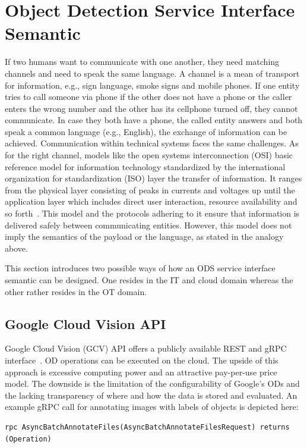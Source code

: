 \section{Object Detection Service Interface Semantic}
If two humans want to communicate with one another, they need matching channels and need to speak the same language. A channel is a mean of transport for information, e.g., sign language, smoke signs and mobile phones. If one entity tries to call someone via phone if the other does not have a phone or the caller enters the wrong number and the other has its cellphone turned off, they cannot communicate. In case they both have a phone, the called entity answers and both speak a common language (e.g., English), the exchange of information can be achieved. Communication within technical systems faces the same challenges. As for the right channel, models like the open systems interconnection (OSI) basic reference model for information technology standardized by the international organization for standardization (ISO) layer the transfer of information. It ranges from the physical layer consisting of peaks in currents and voltages up until the application layer which includes direct user interaction, resource availability and so forth~\cite{InternationalOrganizationForStandardization1996ISO/IECEd.}. This model and the protocols adhering to it ensure that information is delivered safely between communicating entities. However, this model does not imply the semantics of the payload or the language, as stated in the analogy above. 

This section introduces two possible ways of how an ODS service interface semantic can be designed. One resides in the IT and cloud domain whereas the other rather resides in the OT domain.

\subsection{Google Cloud Vision API}
Google Cloud Vision (GCV) API offers a publicly available REST and gRPC interface~\cite{Google-Cloud-Documentation2019Google2019-04-26}. OD operations can be executed on the cloud. The upside of this approach is excessive computing power and an attractive pay-per-use price model. The downside is the limitation of the configurability of Google's ODs and the lacking transparency of where and how the data is stored and evaluated. An example gRPC call for annotating images with labels of objects is depicted here:

\begin{lstlisting}[language=protobuf3,style=protobuf]
    rpc AsyncBatchAnnotateFiles(AsyncBatchAnnotateFilesRequest) returns (Operation)
\end{lstlisting}


